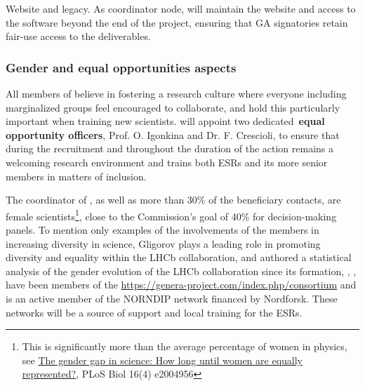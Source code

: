 \noindent \color{blue}Website and legacy. \color{black} 
As coordinator node, \lund will maintain the \acronym website and access to the software beyond the end of the project, ensuring that GA signatories retain fair-use access to the deliverables.



\vspace{-2mm}
\subsubsection{Gender and equal opportunities aspects}
\label{sub:genderEO}

All members of \acronym believe in fostering a research culture where everyone including marginalized groups feel encouraged to collaborate, and hold this particularly important when training new scientists. 
\acronym will appoint two dedicated~\textbf{equal opportunity officers}, Prof. O. Igonkina and Dr. F. Crescioli, to ensure that during the recruitment and throughout the duration of the action \acronym remains a welcoming research environment and trains both ESRs and its more senior members in matters of inclusion. 

The coordinator of \acronym, as well as more than $30\%$ of the beneficiary contacts, are female scientists\footnote{This is significantly more than the average percentage of women in physics, see \href{https://doi.org/10.1371/journal.pbio.2004956}{The gender gap in science: How long until women are equally represented?}, PLoS Biol 16(4) e2004956}, close to the Commission's goal of 40\% for decision-making panels. 
To mention only examples of the involvements of the \acronym members in increasing diversity in science, Gligorov plays a leading role in promoting diversity and equality within the LHCb collaboration, and authored a statistical analysis of the gender evolution of the LHCb collaboration since its formation, \unigeentity, \cnrsentity, \nikhefentity have been members of the \href{H2020 GENERA network}{https://genera-project.com/index.php/consortium} and \lundentity is an active member of the NORNDIP network financed by Nordforsk. These networks will be a source of support and local training for the ESRs. 

